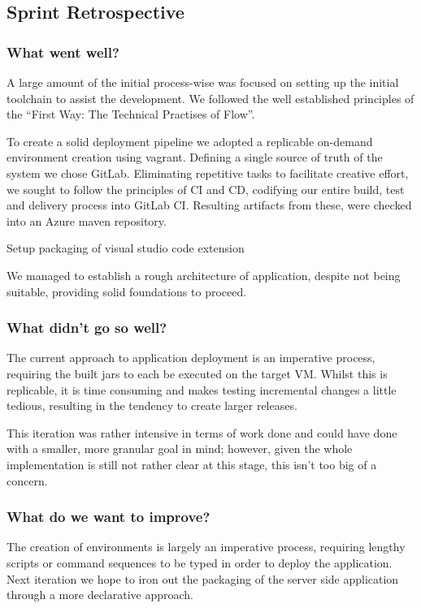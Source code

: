 \subsection{Sprint Retrospective}

\subsubsection{What went well?}

A large amount of the initial process-wise was focused on setting up the initial toolchain to assist the development. We followed the well established principles of the ``First Way: The Technical Practises of Flow''.


To create a solid deployment pipeline we adopted a replicable on-demand environment creation using vagrant. Defining a single source of truth of the system we chose GitLab. Eliminating repetitive tasks to facilitate creative effort, we sought to follow the principles of CI and CD, codifying our entire build, test and delivery process into GitLab CI. Resulting artifacts from these, were checked into an Azure maven repository.

Setup packaging of visual studio code extension

We managed to establish a rough architecture of application, despite not being suitable, providing solid foundations to proceed.

\subsubsection{What didn't go so well?}

The current approach to application deployment is an imperative process, requiring the built jars to each be executed on the target VM. Whilst this is replicable, it is time consuming and makes testing incremental changes a little tedious, resulting in the tendency to create larger releases.

This iteration was rather intensive in terms of work done and could have done with a smaller, more granular goal in mind; however, given the whole implementation is still not rather clear at this stage, this isn't too big of a concern.

\subsubsection{What do we want to improve?}

The creation of environments is largely an imperative process, requiring lengthy scripts or command sequences to be typed in order to deploy the application. Next iteration we hope to iron out the packaging of the server side application through a more declarative approach. 